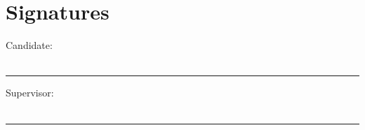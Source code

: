 \section{Signatures}

Candidate:\\
\vspace{4pt}\\
\rule{\textwidth/2}{0.4pt}

\vspace{5pt}

Supervisor:\\
\vspace{4pt}\\
\rule{\textwidth/2}{0.4pt}
